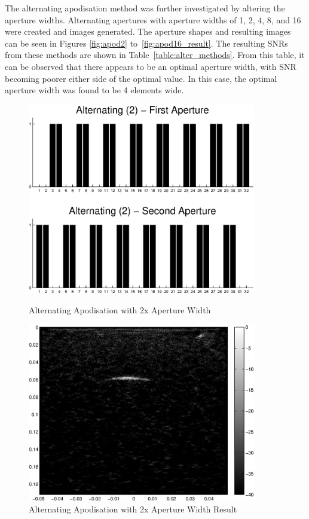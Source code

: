 The alternating apodisation method was further investigated by altering the aperture widths. Alternating apertures with aperture widths of 1, 2, 4, 8, and 16 were created and images generated. The aperture shapes and resulting images can be seen in Figures \ref{fig:apod2} to~\ref{fig:apod16_result}. The resulting SNRs from these methods are shown in Table~\ref{table:alter_methods}. From this table, it can be observed that there appears to be an optimal aperture width, with SNR becoming poorer either side of the optimal value. In this case, the optimal aperture width was found to be 4 elements wide.
\begin{figure}[htbp]
\centering
		\includegraphics[width=100mm]{Alternating2.eps}
		\caption{Alternating Apodisation with 2x Aperture Width}
		\label{fig:apod2}

		\includegraphics[width=100mm]{02_SAC.eps}
		\caption{Alternating Apodisation with 2x Aperture Width Result}
		\label{fig:apod2_result}
\end{figure}

